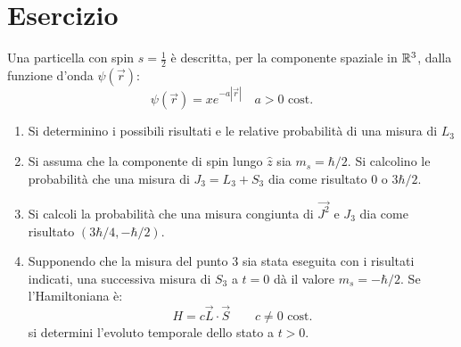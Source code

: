 \documentclass[../../FisicaTeorica.tex]{subfiles}
\begin{document}
\begin{comment}
Eravamo arrivati a:
\[
\underbrace{\hs_{j_1} \otimes \hs_{j_2}}_{\ket{j_1, j_2, m_1, m_2}} = \underbrace{\bigoplus_{j=|j_1-j_2|}^{j_1+j_2}\hs_j}_{\ket{J, M}}
\]
Dove:
\[
\ket{J, M}=\ket{j_1+j_2, j_1+j_2}=\ket{j_1, j_2, j_1, j_2}
\]
Applicando $J_- = J_-^{(1)}+J_-^{(2)}$:
\begin{align*}
\sqrt{(j_1+j_2)(j_1+j_2+1)-(j_1+j_2)(j_1+j_2-1)}\ket{j_1+j_2, j_1+j_2-1} = \\
\sqrt{j_1(j_1+1)-j_1(j_1-1)}\ket{j_1, j_2, j_1-1, j_2}+
\sqrt{j_2(j_2+1)-j_2(j_2-1)}\ket{j_1, j_2, j_1, j_2 -1}
\end{align*}
Se calcoliamo $\ket{j_1+j_2, m}$, 
\[
\braket{j_1+j_2, j_1+j_2-1|j_1+j_2-1, j_1+j_2-1}=0
\]
con la convenzione:
\[
\braket{j_1, j_2, j_1, j-j_1|j,j}\geq 0
\]
\end{comment}

\section{Esercizio \theEsercizio}
Una particella con spin $s=\frac{1}{2}$ è descritta, per la componente spaziale in $\mathbb{R}^3$, dalla funzione d'onda $\psi(\vec{r})$:
\[
\psi(\vec{r})=xe^{-a|\vec{r}|}\quad a>0 \text{ cost.}
\]
\begin{enumerate}
\item Si determinino i possibili risultati e le relative probabilità di una misura di $L_3$
\item Si assuma che la componente di spin lungo $\hat{z}$ sia $m_s=\hbar/2$. Si calcolino le probabilità che una misura di $J_3 = L_3 + S_3$ dia come risultato $0$ o $3\hbar/2$.
\item Si calcoli la probabilità che una misura congiunta di $\vec{J^2}$ e $J_3$ dia come risultato $(3\hbar/4, -\hbar/2)$.
\item Supponendo che la misura del punto $3$ sia stata eseguita con i risultati indicati, una successiva misura di $S_3$ a $t=0$ dà il valore $m_s=-\hbar/2$. Se l'Hamiltoniana è:
\[
H=c\vec{L}\cdot \vec{S} \qquad c \neq 0\text{ cost.}
\]
si determini l'evoluto temporale dello stato a $t>0$.
\end{enumerate}
\end{document}
